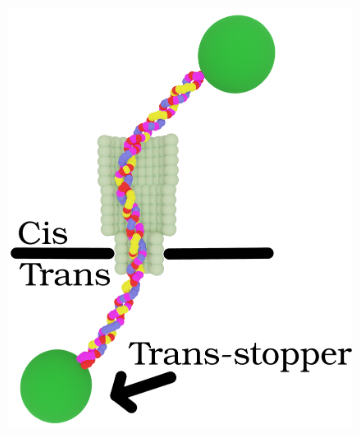 \begin{figure}[ht!]
\begin{centering}
\begin{subfigure}[t]{\dimexpr.46\linewidth-1.3em\relax}
  \end{subfigure}%
  \begin{subfigure}[t]{\dimexpr.21\linewidth-1.3em\relax}
  \hspace{3cm}
  \centering
  \vspace{0.2cm}
  \includegraphics[width=1\linewidth,valign=t]{Figures/Rotaxane-100.png}
  \end{subfigure}
  \label{fig:test}
  \end{centering}

  \vspace{0.05cm}


\end{figure}
